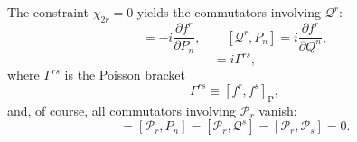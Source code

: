 The constraint $\chi_{2r}=0$ yields the commutators involving
$\mathcal{Q}^r$:
\begin{equation}
  [\mathcal{Q}^r,Q^n]=-i\frac{\partial f^r}{\partial P_n},\qquad
  [\mathcal{Q}^r,P_n]=i\frac{\partial f^r}{\partial Q^n},
  \tag{7.A.4}\label{eq:7.A.4}
\end{equation}
\begin{equation}
  [\mathcal{Q}^r,\mathcal{Q}^s]=i\Gamma^{rs},
  \tag{7.A.5}\label{eq:7.A.5}
\end{equation}
where $\Gamma^{rs}$ is the Poisson bracket
\begin{equation}
  \Gamma^{rs}\equiv[f^r,f^s]_{\mathrm P},
  \tag{7.A.6}\label{eq:7.A.6}
\end{equation}
and, of course, all commutators involving $\mathcal{P}_r$ vanish:
\begin{equation}
  [\mathcal{P}_r,Q^n]=[\mathcal{P}_r,P_n]
  =[\mathcal{P}_r,\mathcal{Q}^s]=[\mathcal{P}_r,\mathcal{P}_s]=0.
  \tag{7.A.7}\label{eq:7.A.7}
\end{equation}

